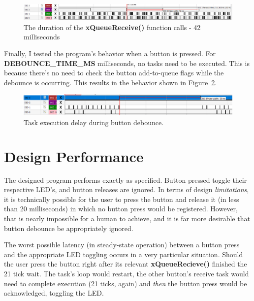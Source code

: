 \documentclass[a4paper, 12pt]{article}
\begin{document}
\begin{figure}[H]
\centering
\includegraphics[width=1\textwidth]{img01.png}
\caption{The duration of the \textbf{xQueueReceive()} function calls - 42 milliseconds}
\label{fig:img01}
\end{figure}

Finally, I tested the program's behavior when a button is pressed. For\\ \textbf{DEBOUNCE\_TIME\_MS} milliseconds, no tasks need to be executed. This is because there's no need to check the button add-to-queue flags while the debounce is occurring. This results in the behavior shown in Figure~\ref{fig:img02}.

\begin{figure}[H]
\centering
\includegraphics[width=1\textwidth]{img02.png}
\caption{Task execution delay during button debounce.}
\label{fig:img02}
\end{figure}
	
\section{Design Performance}
The designed program performs exactly as specified. Button pressed toggle their respective LED's, and button releases are ignored. In terms of design \emph{limitations}, it is technically possible for the user to press the button and release it (in less than 20 milliseconds) in which no button press would be registered. However, that is nearly impossible for a human to achieve, and it is far more desirable that button debounce be appropriately ignored.

The worst possible latency (in steady-state operation) between a button press and the appropriate LED toggling occurs in a very particular situation. Should the user press the button right after its relevant \textbf{xQueueRecieve()} finished the 21 tick wait. The task's loop would restart, the other button's receive task would need to complete execution (21 ticks, again) and \emph{then} the button press would be acknowledged, toggling the LED.
\end{document}
